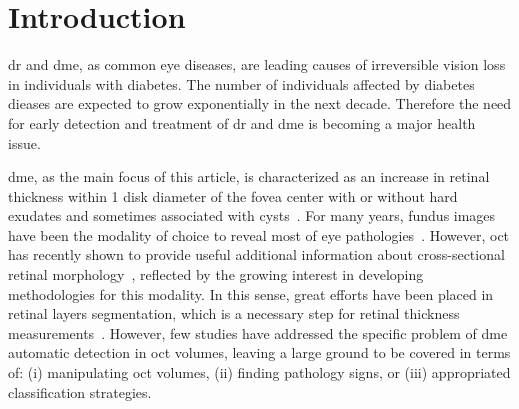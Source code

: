 \graphicspath{ {./content/intro/figures/} }

\section{Introduction}
\label{sec:intro}  %

\gls{dr} and \gls{dme}, as common eye diseases, are leading causes of irreversible vision loss in individuals with diabetes.
The number of individuals affected by diabetes dieases are expected to grow exponentially in the next decade. 
Therefore the need for early detection and treatment of \gls{dr} and \gls{dme} is becoming a major health issue.

\gls{dme}, as the main focus of this article, is characterized as an increase in retinal thickness within 1 disk diameter of the fovea center with or without hard exudates and sometimes associated with cysts~\cite{ETDRSG1985}.
For many years, fundus images have been the modality of choice to reveal most of eye pathologies~\cite{Mookiah20132136,Trucco2013}.
However, \gls{oct} has recently shown to provide useful additional information about cross-sectional retinal morphology~\cite{Wang2015}, reflected by the growing interest in developing methodologies for this modality.
In this sense, great efforts have been placed in retinal layers segmentation, which is a necessary step for retinal thickness measurements~\cite{Chiu2010,Kafieh2013}.
However, few studies have addressed the specific problem of \gls{dme} automatic detection in \gls{oct} volumes, leaving a large ground to be covered in terms of: (i) manipulating \gls{oct} volumes, (ii) finding pathology signs, or (iii) appropriated classification strategies.

